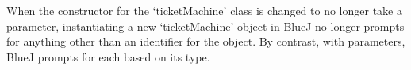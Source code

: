 When the constructor for the `ticketMachine' class is changed to no
longer take a parameter, instantiating a new `ticketMachine' object in
BlueJ no longer prompts for anything other than an identifier for the
object. By contrast, with parameters, BlueJ prompts for each based on
its type.
